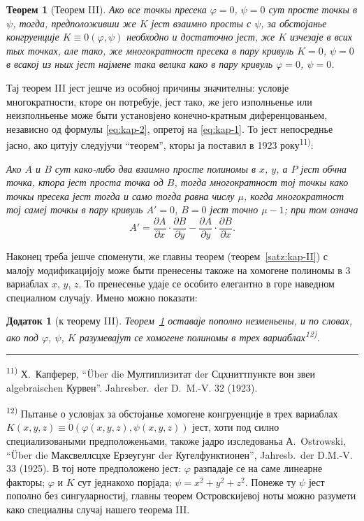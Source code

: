 \documentclass[11pt]{article}
\newcommand{\foreign}[1]{#1}
\theoremstyle{plain}
\newtheorem{satz}{Теорем}
\newtheorem{zusatz}{Додаток}
\begin{document}
\begin{satz}[Теорем III]\label{satz:kap-III}
Ако все точкы пресека $\varphi = 0$, $\psi = 0$ сут просте точкы в
$\psi$, тогда, предположивши же $K$ јест взаимно просты с $\psi$,
за обстојанье конгруенције $K \equiv 0(\varphi, \psi)$ необходно и
достаточно јест, же $K$ изчезаје в всих тых точках, але тако, же
многократност пресека в пару кривуль $K = 0$, $\psi = 0$ в всакој
из ньих јест најмене така велика како в пару кривуль
$\varphi = 0$, $\psi = 0$.
\end{satz}

Тај теорем III јест јешче из особној причины значителны: условје
многократности, кторе он потребује, јест тако, же јего изполньенье
или неизполньенье може быти установјено конечно-кратным
диференцованьем, независно од формулы \eqref{eq:kap-2}, опретој на
\eqref{eq:kap-1}. То јест непосреднье јасно, ако цитују следујучи
``теорем'', кторы ја поставил в 1923 року\textsuperscript{11)}:

\smallskip
\textit{Ако $A$ и $B$ сут како-либо два взаимно просте полиномы в
$x$, $y$, а $P$ јест обчна точка, ктора јест проста точка од $B$,
тогда многократност тој точкы како точкы пресека јест тогда и само
тогда равна числу $\mu$, когда многократност тој самеј точкы в пару
кривуль $A' = 0$, $B = 0$ јест точно $\mu - 1$; при том означа}
\[
A' = \frac{\partial A}{\partial x} \cdot \frac{\partial B}{\partial y} -
\frac{\partial A}{\partial y} \cdot \frac{\partial B}{\partial x}.
\]

Наконец треба јешче споменути, же главны теорем
(теорем~\ref{satz:kap-II}) с малоју модификацијоју може быти
пренесены такоже на хомогене полиномы в 3 вариаблах $x$, $y$, $z$.
То пренесенье удаје се особито елегантно в горе наведном специалном
случају. Имено можно показати:

\begin{zusatz}[к теорему III]
Теорем~\ref{satz:kap-III} оставаје пополно незменьены, и по словах,
ако под $\varphi$, $\psi$, $K$ разумевајут се хомогене полиномы в
трех вариаблах\textsuperscript{12)}.
\end{zusatz}

\vspace{0.5em}
\noindent\rule{\textwidth}{0.4pt}
\vspace{0.3em}

{\footnotesize
\textsuperscript{11)} Х.\ Капферер, ``Über die Мултиплизитат der Сцхниттпункте вон звеи algebraischen
Курвен''. \foreign{Jahresber.\ der D.\ M.-V.} 32 (1923).

\textsuperscript{12)} Пытанье о условјах за обстојанье хомогене конгруенције в
трех вариаблах $K(x,y,z) \equiv 0(\varphi(x,y,z), \psi(x,y,z))$ јест,
хоти под силно специализоваными предположеньами, такоже јадро
изследованьа А.\ Ostrowski, ``Über die Максвеллсцхе Ерзеугунг der
Кугелфунктионен'', \foreign{Jahresb.\ der D.M.-V.} 33 (1925). В тој
ноте предположено јест: $\varphi$ разпадаје се на саме линеарне
факторы; $\varphi$ и $K$ сут једнакохо порјада; $\psi = x^{2} + y^{2} + z^{2}$.
Понеже ту $\psi$ јест пополно без сингуларностиј, главны теорем
Островскијевој ноты можно разумети како специалны случај нашего
теорема III.
}
\end{document}
